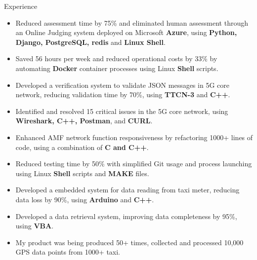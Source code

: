 \documentclass{resume} %
\begin{document}
\begin{workSection}{Experience}
      \experienceItem[
      company=CodePro Education,
      location=Taichung{,} TW,
      position=Software Engineer,
      duration=Dec. 2019 – Dec. 2020
      ]
      \vspace{-0.65em}
      \begin{itemize}
            \itemsep -6pt {}
            \item Reduced assessment time by 75\% and eliminated human assessment through an Online Judging system deployed on Microsoft \textbf{Azure}, using \textbf{Python, Django, PostgreSQL, redis} and \textbf{Linux Shell}.
            \item Saved 56 hours per week and reduced operational costs by 33\% by automating \textbf{Docker} container processes using Linux \textbf{Shell} scripts.
      \end{itemize}

      \experienceItem[
      company=Free5gc department of NCTU,
      location=Hsinchu{,} TW,
      position=Back End Engineer,
      duration=Jul. 2019 – Nov. 2019
      ]
      \vspace{-0.65em}
      \begin{itemize}
            \itemsep -6pt {}
            \item Developed a verification system to validate JSON messages in 5G core network, reducing validation time by 70\%, using \textbf{TTCN-3} and \textbf{C++}.
            \item Identified and resolved 15 critical issues in the 5G core network, using \textbf{Wireshark, C++, Postman}, and \textbf{CURL}.
            \item Enhanced AMF network function responsiveness by refactoring 1000+ lines of code, using a combination of \textbf{C and C++}.
            \item Reduced testing time by 50\% with simplified Git usage and process launching using Linux \textbf{Shell} scripts and \textbf{MAKE} files.
      \end{itemize}

      \experienceItem[
      company=Ministry of Transportation and Communications TW \& NCTU,
      location=Taipei{,} TW,
      position=Embedded System Engineer,
      duration=June 2016 – Sep. 2016
      ]
      \vspace{-0.65em}
      \begin{itemize}
            \itemsep -6pt {}
            \item Developed a embedded system for data reading from taxi meter, reducing data loss by 90\%, using \textbf{Arduino} and \textbf{C++}.
            \item Developed a data retrieval system, improving data completeness by 95\%, using \textbf{VBA}.
            \item My product was being produced 50+ times, collected and processed 10,000 GPS data points from 1000+ taxi.
      \end{itemize}

\end{workSection}

\education{
\educationItem[
university=National Chiao Tung University (NCTU),
location=Hsinchu{,} TW,
program=B.S.{,} Computer Science,
graduation=2018
]
}
\end{document}
